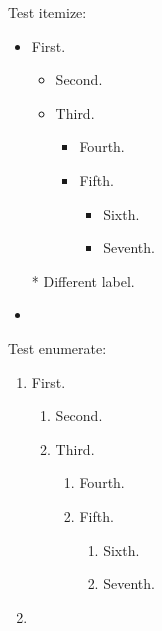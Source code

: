 \documentclass{article}
\begin{document}
Test itemize:
\begin{itemize}
\item First.
 \begin{itemize}
  \item Second.
  \item Third.
  \begin{itemize}
   \item Fourth.
   \item Fifth.
    \begin{itemize}
     \item Sixth.
     \item Seventh.
    \end{itemize}
  \end{itemize}
 \end{itemize}
\item[*] Different label.
\item \lipsum[1]
\end{itemize}

Test enumerate:
\begin{enumerate}
\item First.
 \begin{enumerate}
  \item Second.
  \item Third.
  \begin{enumerate}
   \item Fourth.
   \item Fifth.
    \begin{enumerate}
     \item Sixth.
     \item Seventh.
    \end{enumerate}
  \end{enumerate}
 \end{enumerate}
\item \lipsum[1]
\end{enumerate}
\end{document}

